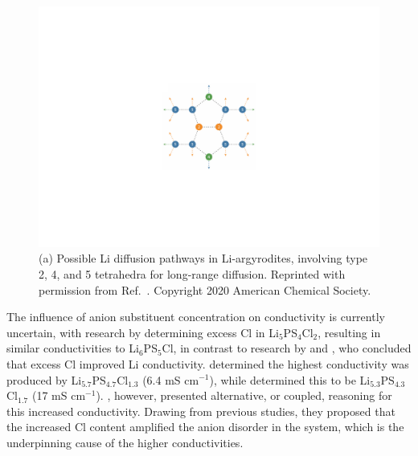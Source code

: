 \documentclass[../main.tex]{subfiles}
\begin{document}
\begin{figure}
    \centering
    \includegraphics[scale=0.65]{figures/diffusion_pathways.pdf}
    \caption{(a) Possible Li diffusion pathways in Li-argyrodites, involving type 2, 4, and 5 tetrahedra for long-range diffusion. Reprinted with permission from Ref.~. Copyright 2020 American Chemical Society.}
    \label{fig:diffusion_pathways}
\end{figure}

The influence of anion substituent concentration on conductivity is currently uncertain, with research by \citeauthor{deklerk2016} determining excess Cl in Li$_5$PS$_4$Cl$_2$, resulting in similar conductivities to Li$_6$PS$_5$Cl,\cite{deklerk2016} in contrast to research by \citeauthor{yu2019tailoring} and \citeauthor{Feng_2020}, who concluded that excess Cl improved Li conductivity.\cite{yu2019tailoring,Feng_2020} \citeauthor{yu2019tailoring} determined the highest conductivity was produced by Li$_{5.7}$PS$_{4.7}$Cl$_{1.3}$ (6.4 mS cm$^{-1}$), \cite{yu2019tailoring,yu_superionic_2020} while \citeauthor{Feng_2020} determined this to be Li$_{5.3}$PS$_{4.3}$Cl$_{1.7}$ (17 mS cm$^{-1}$).\cite{Feng_2020} \citeauthor{Feng_2020}, however, presented alternative, or coupled, reasoning for this increased conductivity. Drawing from previous studies,\cite{adeli2019,zhou_solvent-engineered_2019} they proposed that the increased Cl content amplified the anion disorder in the system, which is the underpinning cause of the higher conductivities.
\end{document}
